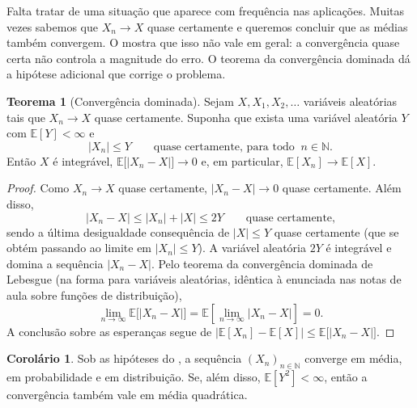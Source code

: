 \documentclass[12pt,portuguese]{article}
\theoremstyle{definition}
\newtheorem{theorem}{Teorema}
\newtheorem{corollary}[corollary]{Corolário}
\theoremstyle{plainexercise}
\theoremstyle{starredexercise}
\theoremstyle{definition}
\begin{document}
Falta tratar de uma situação que aparece com frequência nas aplicações. Muitas
vezes sabemos que $X_n\to X$ quase certamente e queremos concluir que as médias
também convergem. O  mostra que isso não vale em geral: a
convergência quase certa não controla a magnitude do erro. O teorema da
convergência dominada dá a hipótese adicional que corrige o problema.

\begin{theorem}[Convergência dominada]\label{thm:dominada}
Sejam $X,X_1,X_2,\ldots$ variáveis aleatórias tais que $X_n\to X$ quase
certamente. Suponha que exista uma variável aleatória $Y$ com
$\mathbb{E}[Y]<\infty$ e
\[
|X_n|\leqslant Y
\qquad\text{quase certamente, para todo }\ n\in\mathbb{N}.
\]
Então $X$ é integrável, $\mathbb{E}\bigl[|X_n-X|\bigr]\to0$ e, em particular,
$\mathbb{E}[X_n]\to\mathbb{E}[X]$.
\end{theorem}

\begin{proof}
Como $X_n\to X$ quase certamente, $|X_n-X|\to0$ quase certamente. Além disso,
\[
|X_n-X|\leqslant|X_n|+|X|\leqslant2Y
\qquad\text{quase certamente,}
\]
sendo a última desigualdade consequência de $|X|\leqslant Y$ quase certamente
(que se obtém passando ao limite em $|X_n|\leqslant Y$). A variável aleatória $2Y$ é
integrável e domina a sequência $|X_n-X|$. Pelo teorema da convergência
dominada de Lebesgue (na forma para variáveis aleatórias, idêntica à enunciada
nas notas de aula sobre funções de distribuição),
\[
\lim_{n\to\infty}\mathbb{E}\bigl[|X_n-X|\bigr] 
= 
\mathbb{E}\left[ \lim_{n\to\infty}|X_n-X| \right]=0.
\]
A conclusão sobre as esperanças segue de
$\bigl|\mathbb{E}[X_n]-\mathbb{E}[X]\bigr|\leqslant\mathbb{E}\bigl[|X_n-X|\bigr]$.
\end{proof}

\begin{corollary}\label{cor:dominada}
Sob as hipóteses do , a sequência $(X_n)_{n\in\mathbb{N}}$ converge em média, em
probabilidade e em distribuição. Se, além disso, $\mathbb{E}[Y^2]<\infty$,
então a convergência também vale em média quadrática.
\end{corollary}
\end{document}
